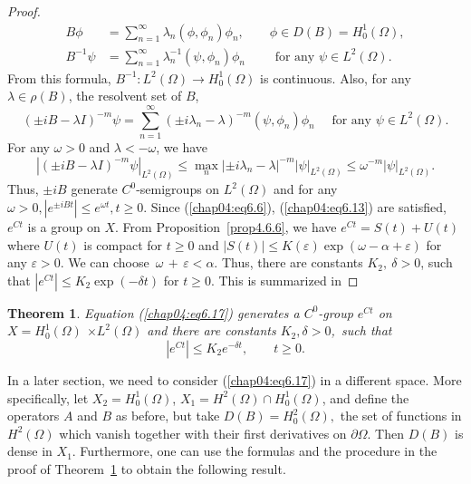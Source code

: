 \documentclass{surv-l}
\theoremstyle{plain}
\newtheorem{theorem}{Theorem}[section]
\theoremstyle{definition}
\numberwithin{equation}{section}
\numberwithin{figure}{chapter}
\begin{document}
\begin{proof}
\begin{align*}
B\phi &= \sum_{n=1}^{\infty}\lambda_{n}(\phi, \phi_{n})\phi_{n}, \qquad \phi \in D(B)=H_{0}^{1}(\Omega),\\
B^{-1}\psi&=\sum_{n=1}^{\infty}\lambda_{n}^{-1}(\psi, \phi_{n})\phi_{n} \qquad \text{ for any } \psi\in L^{2}(\Omega).
\end{align*}
From this formula, $B^{-1}\!:L^{2}(\Omega)\rightarrow H_{0}^{1}(\Omega)$ is continuous. Also, for any $\lambda\in \rho(B)$, the resolvent set of $B$,
\begin{equation*}
(\pm iB-\lambda I)^{-m}\psi=\sum_{n=1}^{\infty}(\pm i\lambda_{n}-\lambda)^{-m}(\psi, \phi_{n})\phi_{n}\quad \text{ for any } \psi\in L^{2}(\Omega).
\end{equation*}
For any $\omega>0$ and $\lambda<-\omega$, we have
\begin{equation*}
|(\pm iB-\lambda I)^{-m}\psi|_{L^{2}(\Omega)}\leq\max_{n}|\pm i\lambda_{n}-\lambda|^{-m}|\psi|_{L^{2}(\Omega)}\leq\omega^{-m}|\psi|_{L^{2}(\Omega)}.
\end{equation*}
Thus, $\pm iB$ generate $C^{0}$-semigroups on $L^{2}(\Omega)$ and for any $\omega>0, |e^{\pm iBt}|\leq e^{\omega t}, t\geq 0$. Since (\ref{chap04:eq6.6}), (\ref{chap04:eq6.13}) are satisfied, $e^{Ct}$ is a group on $X$. From Proposition~\ref{prop4.6.6}, we have $e^{Ct}=S(t)+U(t)$ where $U(t)$ is compact for $t\geq 0$ and $|S(t)|\leq K(\varepsilon)\exp(\omega-\alpha+\varepsilon)$ for any $\varepsilon >0$. We can choose\, $\omega\,+\,\varepsilon <\alpha$. Thus, there are constants $K_{2},\ \delta >0$, such that $|e^{Ct}|\leq K_{2}\exp(-\delta t)$ for $t\geq 0$. This is summarized in
\end{proof}

\begin{theorem}\label{thm4.6.7} Equation \emph{(\ref{chap04:eq6.17})} generates a $C^{0}$-group $e^{Ct}$ on $X=H_{0}^{1}(\Omega)$
$\times L^{2}(\Omega)$ and there are constants $K_{2}, \delta > 0$,\, such that
\begin{equation*}
|e^{Ct}|\leq K_{2}e^{-\delta t},\qquad t\geq 0.
\end{equation*}
\end{theorem}

In a later section, we need to consider (\ref{chap04:eq6.17}) in a different space. More specifically, let $X_{2}=H_{0}^{1}(\Omega)$, $X_{1}=H^{2}(\Omega)\cap H_{0}^{1}(\Omega)$, and define the operators $A$ and $B$ as before, but take $D(B)=H_{0}^{2}(\Omega),$ the set of functions in $H^{2}(\Omega)$ which vanish together with their first derivatives on $\partial\Omega$. Then $D(B)$ is dense in $X_{1}$. Furthermore, one can use the formulas and the procedure in the proof of Theorem~\ref{thm4.6.7} to obtain the following result.
\end{document}
